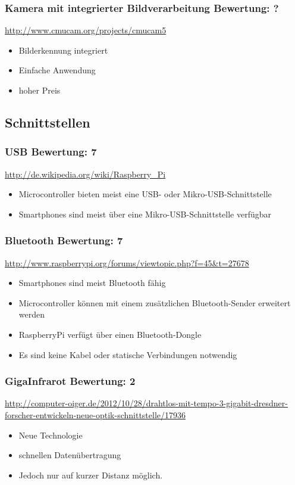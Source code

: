 \subsubsection{Kamera mit integrierter Bildverarbeitung \hfill Bewertung: ?}
\url{http://www.cmucam.org/projects/cmucam5}
\begin{itemize}
    \item Bilderkennung integriert
    \item Einfache Anwendung
    \item hoher Preis
\end{itemize}

\subsection{Schnittstellen}

\subsubsection{USB  \hfill Bewertung: 7}
\url{http://de.wikipedia.org/wiki/Raspberry_Pi}
\begin{itemize}
    \item Microcontroller bieten meist eine USB- oder Mikro-USB-Schnittstelle
    \item Smartphones sind meist über eine Mikro-USB-Schnittstelle verfügbar
\end{itemize}

\subsubsection{Bluetooth  \hfill Bewertung: 7}
\url{http://www.raspberrypi.org/forums/viewtopic.php?f=45&t=27678}
\begin{itemize}
    \item Smartphones sind meist Bluetooth fähig
    \item Microcontroller können mit einem zusätzlichen Bluetooth-Sender erweitert werden
    \item RaspberryPi verfügt über einen Bluetooth-Dongle
    \item Es sind keine Kabel oder statische Verbindungen notwendig
\end{itemize}

\subsubsection{GigaInfrarot  \hfill Bewertung: 2}
\url{http://computer-oiger.de/2012/10/28/drahtlos-mit-tempo-3-gigabit-dresdner-forscher-entwickeln-neue-optik-schnittstelle/17936}
\begin{itemize}
    \item Neue Technologie
    \item schnellen Datenübertragung
    \item Jedoch nur auf kurzer Distanz möglich.
\end{itemize}

